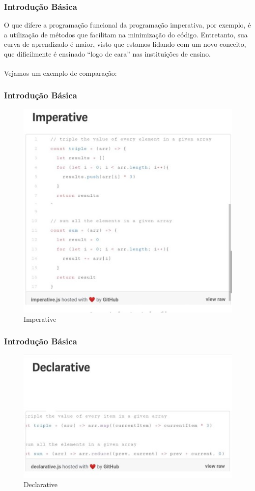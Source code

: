 \documentclass{beamer}
\begin{document}
\begin{frame}
\frametitle{Introdução Básica}
O que difere a programação funcional da programação imperativa, por exemplo, é a utilização de métodos que facilitam na minimização do código. Entretanto, sua curva de aprendizado é maior, visto que estamos lidando com um novo conceito, que dificilmente é ensinado “logo de cara” nas instituições de ensino. \\~\\
Vejamos um exemplo de comparação:

\end{frame}



\begin{frame}
\frametitle{Introdução Básica}
\begin{figure}[!ht]
    \centering
    \includegraphics[width=.5\columnwidth]{Imagens/Imagem1.jpg}
    \caption{Imperative}
    \label{fig:my_label}
\end{figure}

\end{frame}


\begin{frame}
\frametitle{Introdução Básica}
\begin{figure}[!ht]
    \centering
    \includegraphics[width=.8\columnwidth]{Imagens/Imagem2.jpg}
    \caption{Declarative}
    \label{fig:my_label}
\end{figure}

\end{frame}
\end{document}
